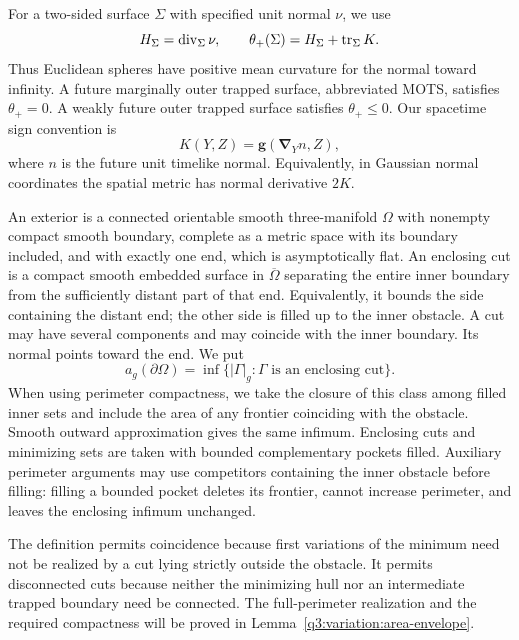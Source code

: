 For a two-sided surface \(\Sigma\) with specified unit normal \(\nu\),
we use
\[
 H_\Sigma=\operatorname{div}_\Sigma\nu,\qquad
 \theta_+(\Sigma)=H_\Sigma+\operatorname{tr}_\Sigma K.
\]
Thus Euclidean spheres have positive mean curvature for the normal
toward infinity. A future marginally outer trapped surface, abbreviated
MOTS, satisfies \(\theta_+=0\). A weakly future outer trapped surface
satisfies \(\theta_+\le0\). Our spacetime sign convention is
\begin{equation}\label{q3:intro:k-sign}
 K(Y,Z)=\mathbf g(\mathbf\nabla_Y n,Z),
\end{equation}
where \(n\) is the future unit timelike normal. Equivalently, in Gaussian
normal coordinates the spatial metric has normal derivative \(2K\).

\begin{definition}\label{q3:intro:exterior-class}
An exterior is a connected orientable smooth three-manifold \(\Omega\)
with nonempty compact smooth boundary, complete as a metric space with
its boundary included, and with exactly one end, which is asymptotically flat.
An enclosing cut is a compact smooth embedded surface in
\(\overline\Omega\) separating the entire inner boundary from the
sufficiently distant part of that end. Equivalently, it bounds the side
containing the distant end; the other side is filled up to the inner
obstacle. A cut may have several components and may coincide with the
inner boundary. Its normal points toward the end. We put
\[
 a_g(\partial\Omega)=
  \inf\{|\Gamma|_g:\Gamma\text{ is an enclosing cut}\}.
\]
When using perimeter compactness, we take the closure of this class
among filled inner sets and include the area of any frontier coinciding
with the obstacle. Smooth outward approximation gives the same
infimum. Enclosing cuts and minimizing sets are taken with bounded
complementary pockets filled. Auxiliary perimeter arguments may use
competitors containing the inner obstacle before filling: filling a bounded
pocket deletes its frontier, cannot increase perimeter, and leaves the enclosing
infimum unchanged.
\end{definition}

The definition permits coincidence because first variations of the
minimum need not be realized by a cut lying strictly outside the
obstacle. It permits disconnected cuts because neither the minimizing
hull nor an intermediate trapped boundary need be connected. The full-perimeter realization and the required compactness will be proved
in Lemma~\ref{q3:variation:area-envelope}.


